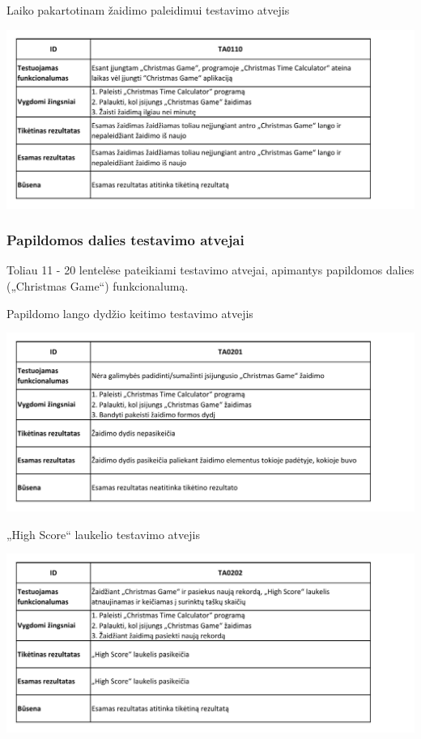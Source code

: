 \documentclass{VUMIFPSkursinis}
\begin{document}
				\begin{table}[H]
					\centering
					\caption{Laiko pakartotinam žaidimo paleidimui testavimo atvejis}
					\includegraphics[width=\textwidth]{TA/TA0110}			
					\label{fig:TA0110}
				\end{table}
			\subsubsection{Papildomos dalies testavimo atvejai} \label{papildomosDaliesTA}
				Toliau 11 - 20 lentelėse pateikiami testavimo atvejai, apimantys papildomos dalies („Christmas Game“) funkcionalumą.
				\begin{table}[H]
					\centering
					\caption{Papildomo lango dydžio keitimo testavimo atvejis}
					\includegraphics[width=\textwidth]{TA/TA0201}			
					\label{fig:TA0201}
				\end{table}
				\begin{table}[H]
					\centering
					\caption{„High Score“ laukelio testavimo atvejis}
					\includegraphics[width=\textwidth]{TA/TA0202}			
					\label{fig:TA0202}
				\end{table}
\end{document}
